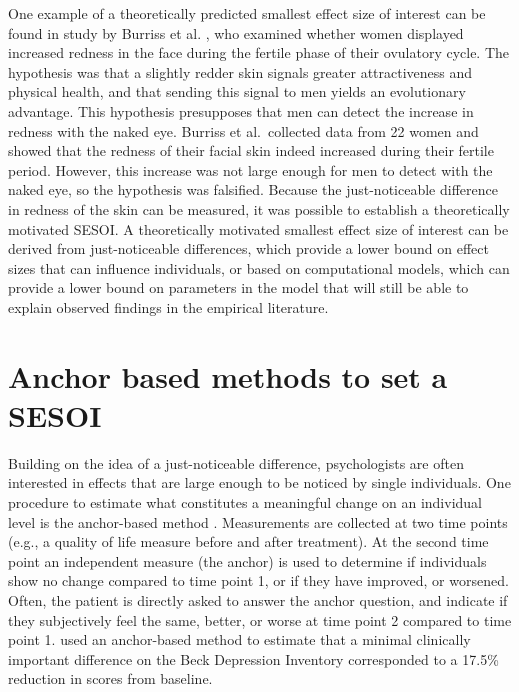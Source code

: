 \documentclass[
  oneside]{book}
\begin{document}
One example of a theoretically predicted smallest effect size of interest can be found in study by Burriss et al. \citeyearpar{burriss_changes_2015}, who examined whether women displayed increased redness in the face during the fertile phase of their ovulatory cycle. The hypothesis was that a slightly redder skin signals greater attractiveness and physical health, and that sending this signal to men yields an evolutionary advantage. This hypothesis presupposes that men can detect the increase in redness with the naked eye. Burriss et al.~collected data from 22 women and showed that the redness of their facial skin indeed increased during their fertile period. However, this increase was not large enough for men to detect with the naked eye, so the hypothesis was falsified. Because the just-noticeable difference in redness of the skin can be measured, it was possible to establish a theoretically motivated SESOI. A theoretically motivated smallest effect size of interest can be derived from just-noticeable differences, which provide a lower bound on effect sizes that can influence individuals, or based on computational models, which can provide a lower bound on parameters in the model that will still be able to explain observed findings in the empirical literature.

\hypertarget{anchor-based-methods-to-set-a-sesoi}{%
\section{Anchor based methods to set a SESOI}\label{anchor-based-methods-to-set-a-sesoi}}

Building on the idea of a just-noticeable difference, psychologists are often interested in effects that are large enough to be noticed by single individuals. One procedure to estimate what constitutes a meaningful change on an individual level is the anchor-based method \citep{jaeschke_measurement_1989, norman_truly_2004, king_point_2011}. Measurements are collected at two time points (e.g., a quality of life measure before and after treatment). At the second time point an independent measure (the anchor) is used to determine if individuals show no change compared to time point 1, or if they have improved, or worsened. Often, the patient is directly asked to answer the anchor question, and indicate if they subjectively feel the same, better, or worse at time point 2 compared to time point 1. \citet{button_minimal_2015} used an anchor-based method to estimate that a minimal clinically important difference on the Beck Depression Inventory corresponded to a 17.5\% reduction in scores from baseline.
\end{document}
